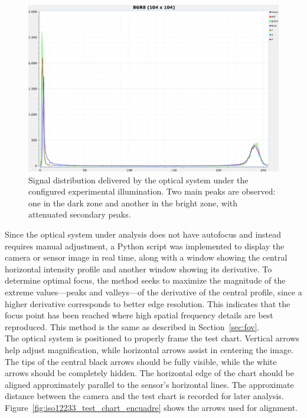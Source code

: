 \begin{figure}[H]
    \centering
    \includegraphics[width=1\linewidth]{Figures/C3/Histogram_MTF.pdf}
    \caption{Signal distribution delivered by the optical system under the configured experimental illumination. Two main peaks are observed: one in the dark zone and another in the bright zone, with attenuated secondary peaks.}
    \label{fig:illumination_distribution}
\end{figure}

\noindent Since the optical system under analysis does not have autofocus and instead requires manual adjustment, a Python script was implemented to display the camera or sensor image in real time, along with a window showing the central horizontal intensity profile and another window showing its derivative. To determine optimal focus, the method seeks to maximize the magnitude of the extreme values—peaks and valleys—of the derivative of the central profile, since a higher derivative corresponds to better edge resolution. This indicates that the focus point has been reached where high spatial frequency details are best reproduced. This method is the same as described in Section~\ref{sec:fov}.\\


\noindent The optical system is positioned to properly frame the test chart. Vertical arrows help adjust magnification, while horizontal arrows assist in centering the image. The tips of the central black arrows should be fully visible, while the white arrows should be completely hidden. The horizontal edge of the chart should be aligned approximately parallel to the sensor’s horizontal lines. The approximate distance between the camera and the test chart is recorded for later analysis. Figure~\ref{fig:iso12233_test_chart_encuadre} shows the arrows used for alignment.\\

